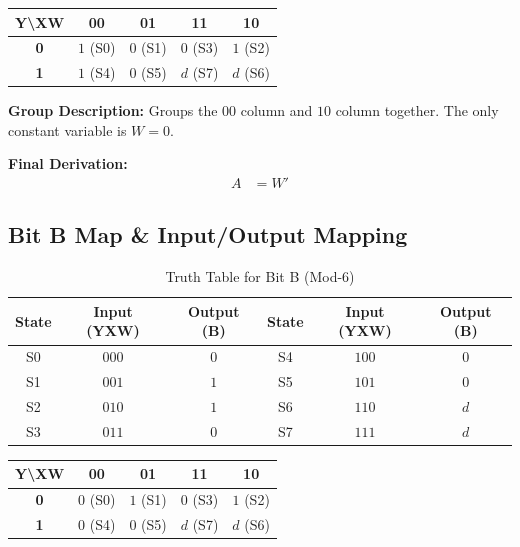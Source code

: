 \documentclass[journal,12pt,onecolumn]{IEEEtran}
\begin{document}
		\begin{table}[H]
			\centering
			\begin{tabular}{|c|c|c|c|c|}
				\hline
				\textbf{Y\textbackslash XW} & \textbf{00} & \textbf{01} & \textbf{11} & \textbf{10} \\
				\hline
				\textbf{0} & \cellcolor{grpRed}$1$ (S0) & $0$ (S1) & $0$ (S3) & \cellcolor{grpRed}$1$ (S2) \\
				\hline
				\textbf{1} & \cellcolor{grpRed}$1$ (S4) & $0$ (S5) & \cellcolor{grpRed}$d$ (S7) & \cellcolor{grpRed}$d$ (S6) \\
				\hline
			\end{tabular}
		\end{table}
		
		\begin{justify}
			\textbf{Group Description:} Groups the $00$ column and $10$ column together. The only constant variable is $W=0$.
			
			\textbf{Final Derivation:}
			\begin{align}
				A &= W'
			\end{align}
		\end{justify}
		
		\vspace{1em}
		\subsection{Bit B Map \& Input/Output Mapping}
		
		\begin{table}[H]
			\centering
			\begin{tabular}{|c|c|c||c|c|c|}
				\hline
				\textbf{State} & \textbf{Input (YXW)} & \textbf{Output (B)} & \textbf{State} & \textbf{Input (YXW)} & \textbf{Output (B)} \\
				\hline
				S0 & $000$ & $0$ & S4 & $100$ & $0$ \\
				\hline
				S1 & $001$ & $1$ & S5 & $101$ & $0$ \\
				\hline
				S2 & $010$ & $1$ & S6 & $110$ & $d$ \\
				\hline
				S3 & $011$ & $0$ & S7 & $111$ & $d$ \\
				\hline
			\end{tabular}
			\caption{Truth Table for Bit B (Mod-6)}
		\end{table}
		
		\begin{table}[H]
			\centering
			\begin{tabular}{|c|c|c|c|c|}
				\hline
				\textbf{Y\textbackslash XW} & \textbf{00} & \textbf{01} & \textbf{11} & \textbf{10} \\
				\hline
				\textbf{0} & $0$ (S0) & \cellcolor{grpRed}$1$ (S1) & $0$ (S3) & \cellcolor{grpGreen}$1$ (S2) \\
				\hline
				\textbf{1} & $0$ (S4) & $0$ (S5) & \cellcolor{grpGreen}$d$ (S7) & \cellcolor{grpGreen}$d$ (S6) \\
				\hline
			\end{tabular}
		\end{table}
		
\end{document}
